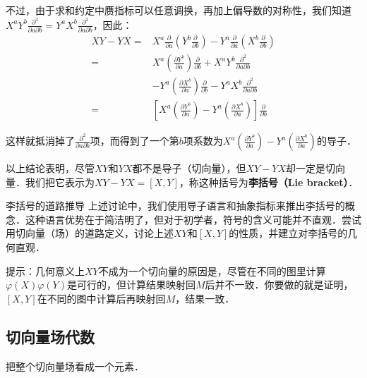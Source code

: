 不过，由于求和约定中赝指标可以任意调换，再加上偏导数的对称性，我们知道$X^aY^b\frac{\partial^2}{\partial a\partial b}=Y^aX^b\frac{\partial^2}{\partial a\partial b}$，因此：
\begin{equation}
\begin{aligned}
XY-YX=&X^a\frac{\partial}{\partial a}(Y^b\frac{\partial}{\partial b})-Y^a\frac{\partial}{\partial a}(X^b\frac{\partial}{\partial b})\\
=&X^a(\frac{\partial Y^b}{\partial a})\frac{\partial}{\partial b}+X^aY^b\frac{\partial^2}{\partial a\partial b}\\&-Y^a(\frac{\partial X^b}{\partial a})\frac{\partial}{\partial b}-Y^aX^b\frac{\partial^2}{\partial a\partial b}\\
=&[X^a(\frac{\partial Y^b}{\partial a})-Y^a(\frac{\partial X^b}{\partial a})]\frac{\partial}{\partial b}
\end{aligned}
\end{equation}

这样就抵消掉了$\frac{\partial^2}{\partial a\partial b}$项，而得到了一个第$b$项系数为$X^a(\frac{\partial Y^b}{\partial a})-Y^a(\frac{\partial X^b}{\partial a})$的导子．

以上结论表明，尽管$XY$和$YX$都不是导子（切向量），但$XY-YX$却一定是切向量．我们把它表示为$XY-YX=[X, Y]$，称这种括号为\textbf{李括号（Lie bracket）}．

\begin{exercise}{李括号的道路推导}
上述讨论中，我们使用导子语言和抽象指标来推出李括号的概念．这种语言优势在于简洁明了，但对于初学者，符号的含义可能并不直观．尝试用切向量（场）的道路定义，讨论上述$XY$和$[X, Y]$的性质，并建立对李括号的几何直观．

提示：几何意义上$XY$不成为一个切向量的原因是，尽管在不同的图里计算$\varphi(X)\varphi(Y)$是可行的，但计算结果映射回$M$后并不一致．你要做的就是证明，$[X, Y]$在不同的图中计算后再映射回$M$，结果一致．
\end{exercise}

\subsection{切向量场代数}

把整个切向量场看成一个元素．


